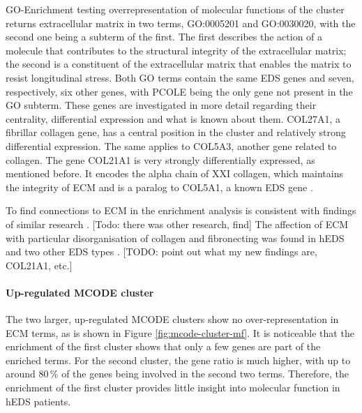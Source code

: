 GO-Enrichment testing overrepresentation of molecular functions of the cluster returns extracellular matrix in two terms, GO:0005201 and GO:0030020, with the second one being a subterm of the first. The first describes the action of a molecule that contributes to the structural integrity of the extracellular matrix; the second is a constituent of the extracellular matrix that enables the matrix to resist longitudinal stress. Both GO terms contain the same EDS genes and seven, respectively, six other genes, with PCOLE being the only gene not present in the GO subterm. These genes are investigated in more detail regarding their centrality, differential expression and what is known about them. COL27A1, a fibrillar collagen gene, has a central position in the cluster and relatively strong differential expression. The same applies to COL5A3, another gene related to collagen. The gene COL21A1 is very strongly differentially expressed, as mentioned before. It encodes the alpha chain of XXI collagen, which maintains the integrity of ECM and is a paralog to COL5A1, a known EDS gene \cite{COL21A1}.

To find connections to ECM in the enrichment analysis is consistent with findings of similar research \cite{Ritelli2022}. [Todo: there was other research, find] The affection of ECM with particular disorganisation of collagen and fibronecting was found in hEDS and two other EDS types \cite{Chiarelli2018}. [TODO: point out what my new findings are, COL21A1, etc.]

\paragraph{Up-regulated MCODE cluster}

The two larger, up-regulated MCODE clusters show no over-representation in ECM terms, as is shown in Figure \ref{fig:mcode-cluster-mf}. It is noticeable that the enrichment of the first cluster shows that only a few genes are part of the enriched terms. For the second cluster, the gene ratio is much higher, with up to around 80\,\% of the genes being involved in the second two terms. Therefore, the enrichment of the first cluster provides little insight into molecular function in hEDS patients.

